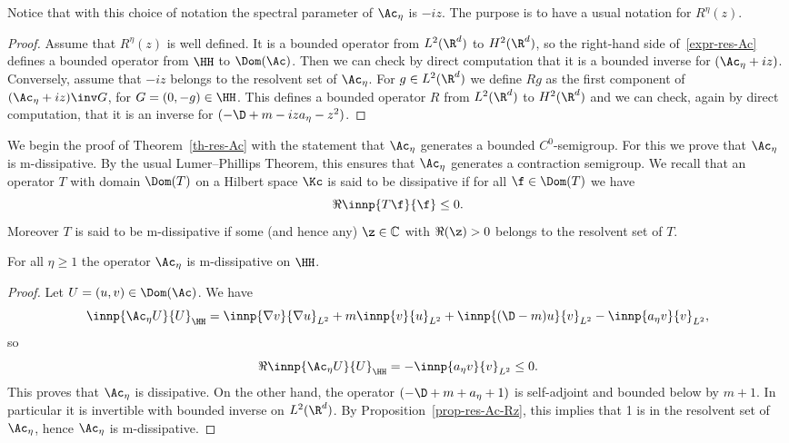Notice that with this choice of notation the spectral parameter of $\Ac_\eta$ is $-iz$. The purpose is to have a usual notation for $R^\eta(z)$.

\begin{proof}
Assume that $R^\eta(z)$ is well defined. It is a bounded operator from $L^2(\R^d)$ to $H^2(\R^d)$, so the right-hand side of~\eqref{expr-res-Ac} defines a bounded operator from $\HH$ to $\Dom(\Ac)$. Then we can check by direct computation that it is a bounded inverse for $(\Ac_\eta + iz)$. Conversely, assume that $-iz$ belongs to the resolvent set of $\Ac_\eta$. For $g \in L^2(\R^d)$ we define $Rg$ as the first component of $(\Ac_\eta + iz)\inv G$, for $G = (0,-g) \in \HH$. This defines a bounded operator $R$ from $L^2(\R^d)$ to $H^2(\R^d)$ and we can check, again by direct computation, that it is an inverse for ${(-\D + m - iza_\eta - z^2)}$.
\end{proof}

We begin the proof of Theorem~\ref{th-res-Ac} with the statement that $\Ac_\eta$ generates a bounded $C^0$-semigroup. For this we prove that $\Ac_\eta$ is \textsf{m}-dissipative. By the usual Lumer--Phillips Theorem, this ensures that $\Ac_\eta$ generates a contraction semigroup. We recall that an operator $T$ with domain $\Dom(T)$ on a Hilbert space $\Kc$ is said to be dissipative if for all $\f \in \Dom(T)$ we have
\[
\Re \innp{T\f}{\f} \leq 0.
\]
Moreover $T$ is said to be \textsf{m}-dissipative if some (and hence any) $\z \in \mathbb C$ with $\Re(\z) > 0$ belongs to the resolvent set of $T$.

\begin{prop}\label{prop-Ac-diss}
For all $\eta \geq 1$ the operator $\Ac_\eta$ is \textsf{m}-dissipative on $\HH$.
\end{prop}

\begin{proof}
Let $U = (u,v) \in \Dom(\Ac)$. We have
\[
\innp{\Ac_\eta U}{U}_\HH = \innp{\nabla v}{\nabla u}_{L^2} + m \innp{v}{u}_{L^2} + \innp{(\D - m) u}{v}_{L^2} - \innp{a_\eta v}{v}_{L^2},
\]
so
\[
\Re \innp{\Ac_\eta U}{U}_\HH = - \innp{a_\eta v}{v}_{L^2} \leq 0.
\]
This proves that $\Ac_\eta$ is dissipative. On the other hand, the operator $(-\D + m + a_\eta + 1)$ is self-adjoint and bounded below by $m+1$. In particular it is invertible with bounded inverse on $L^2(\R^d)$. By Proposition~\ref{prop-res-Ac-Rz}, this implies that 1 is in the resolvent set of $\Ac_\eta$, hence $\Ac_\eta$ is \textsf{m}-dissipative.
\end{proof}


